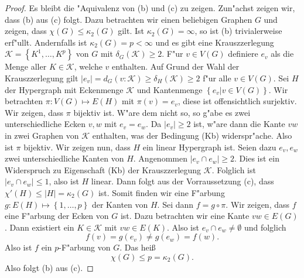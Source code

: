 \begin{proof}
  Es bleibt die "Aquivalenz von (b) und (c) zu zeigen. 
  Zun"achst zeigen wir, dass (b) aus (c) folgt. Dazu betrachten wir einen beliebigen Graphen $G$ und zeigen, dass $\chi(G) \leq \kappa_{2}(G)$ gilt. Ist $\kappa_{2}(G) = \infty$, so ist (b) trivialerweise erf"ullt. Andernfalls ist $\kappa_{2}(G) = p < \infty $ und es gibt eine Krauszzerlegung $\mathcal{K}= \left\{ K^{1},\dots,K^{p} \right\}$ von $G$ mit $\delta_{G}(\mathcal{K}) \geq 2 $.  
  F"ur $v\in V(G)$ definiere $e_v$ als die Menge aller $K\in \mathcal{K}$, welche $v$ enthalten. Auf Grund der Wahl der Krauszzerlegung gilt $|e_v| = d_{G}(v:\mathcal{K})\geq \delta_{H}(\mathcal{K}) \geq 2$ f"ur alle $v \in V(G)$. Sei $H$ der Hypergraph mit Eckenmenge $\mathcal{K}$ und Kantenmenge $\left\{ e_v| v\in V(G) \right\}$. Wir betrachten $\pi: V(G) \mapsto E(H)$ mit $\pi(v) = e_v$, diese ist offensichtlich surjektiv. Wir zeigen, dass $\pi$ bijektiv ist. W"are dem nicht so, so g"abe es zwei unterschiedliche Ecken $v,w$ mit $e_v = e_w$. 
  Da $|e_v| \geq 2$ ist,  w"are dann die Kante $vw$ in zwei Graphen von $\mathcal{K}$ enthalten, was der Bedingung (Kb) widerspr"ache. Also ist $\pi$ bijektiv.
  Wir zeigen nun, dass $H$ ein linear Hypergraph ist. 
  Seien dazu $e_{v},e_{w} $ zwei unterschiedliche Kanten von $H$.
  Angenommen $|e_{v}\cap e_{w}| \geq 2$. Dies ist ein Widerspruch zu Eigenschaft (Kb) der Krauszzerlegung $\mathcal{K}$. Folglich ist $|e_{v}\cap e_{w}| \leq 1$, also ist $H$ linear. Dann folgt aus der Vorraussetzung (c), dass $\chi'(H) \leq |H| = \kappa_{2}(G)$ ist.
  Somit finden wir eine F"arbung $g : E(H) \mapsto \left\{ 1,\dots,p \right\}$ der Kanten von $H$. Sei dann $f =  g \circ \pi$. Wir zeigen, dass $f$ eine F"arbung der Ecken von $G$ ist. Dazu betrachten wir eine Kante $vw\in E(G)$. Dann existiert ein $K\in \mathcal{K}$ mit $vw\in E(K)$. Also ist $e_v\cap e_w \neq \emptyset$ und folglich \begin{equation*}
    f(v) = g(e_v) \neq g(e_w) = f(w).
  \end{equation*} 
  Also ist $f$ ein $p$-F"arbung von $G$. Das hei{\ss}
  \begin{equation*}
    \chi(G) \leq p = \kappa_{2}(G).
  \end{equation*}
  Also folgt (b) aus (c).


\end{proof}
